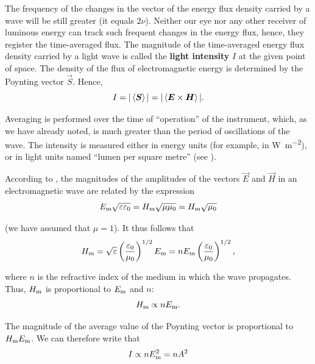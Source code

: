\noindent
The frequency of the changes in the vector of the energy flux density carried by a wave will be still greater (it equals $2\nu$).
Neither our eye nor any other receiver of luminous energy can track such frequent changes in the energy flux, hence, they register the time-averaged flux. The magnitude of the time-averaged energy flux density carried by a light wave is called the \textbf{light intensity} $I$ at the given point of space.
The density of the flux of electromagnetic energy is determined by the Poynting vector $\vec{S}$.
Hence,
\begin{equation}\label{eq:16_7}
    I = |\left\langle \boldsymbol{S} \right\rangle| = |\left\langle \boldsymbol{E}\times\boldsymbol{H} \right\rangle|.
\end{equation}

\noindent
Averaging is performed over the time of ``operation'' of the instrument, which, as we have already noted, is much greater than the period of oscillations of the wave.
The intensity is measured either in energy units (for example, in \si{\watt\per\metre\squared}), or in light units named ``lumen per square metre'' (see ).

According to , the magnitudes of the amplitudes of the vectors $\vec{E}$ and $\vec{H}$ in an electromagnetic wave are related by the expression
\begin{equation*}
    E_{\text{m}} \sqrt{\varepsilon\varepsilon_0} = H_{\text{m}} \sqrt{\mu\mu_0} = H_{\text{m}} \sqrt{\mu_0}
\end{equation*}

\noindent
(we have assumed that $\mu=1$).
It thus follows that
\begin{equation*}
    H_{\text{m}} = \sqrt{\varepsilon} \left(\frac{\varepsilon_0}{\mu_0}\right)^{1/2} E_{\text{m}} = n E_{\text{m}} \left(\frac{\varepsilon_0}{\mu_0}\right)^{1/2},
\end{equation*}

\noindent
where $n$ is the refractive index of the medium in which the wave propagates.
Thus, $H_{\text{m}}$ is proportional to $E_{\text{m}}$ and $n$:
\begin{equation}\label{eq:16_8}
    H_{\text{m}} \propto n E_{\text{m}}.
\end{equation}

\noindent
The magnitude of the average value of the Poynting vector is proportional to $H_{\text{m}}E_{\text{m}}$. We can therefore write that
\begin{equation}\label{eq:16_9}
    I \propto n E_{\text{m}}^2 = n A^2
\end{equation}

